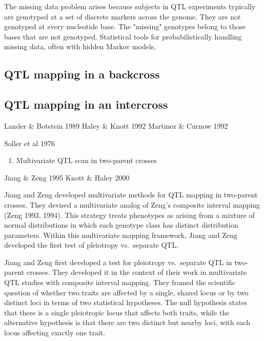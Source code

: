 \documentclass[]{article}
\providecommand{\tightlist}{%
  \setlength{\itemsep}{0pt}\setlength{\parskip}{0pt}}
\begin{document}
The missing data problem arises because subjects in QTL experiments typically are genotyped at a set of discrete markers across the genome. They are not genotyped at every nucleotide base. The "missing" genotypes belong to those bases that are not genotyped. Statistical tools for probabilistically handling missing data, often with hidden Markov models, 




\subsection{QTL mapping in a backcross}




\subsection{QTL mapping in an intercross}




Lander \& Botstein 1989 Haley \& Knott 1992 Martinez \& Curnow 1992

Soller et al 1976

\begin{enumerate}
\def\labelenumi{\arabic{enumi}.}
\setcounter{enumi}{2}
\tightlist
\item
  Multivariate QTL scan in two-parent crosses
\end{enumerate}

Jiang \& Zeng 1995 Knott \& Haley 2000

Jiang and Zeng developed multivariate methods for QTL mapping in
two-parent crosses. They devised a multivariate analog of Zeng's
composite interval mapping (Zeng 1993, 1994). This strategy treats
phenotypes as arising from a mixture of normal distributions in which
each genotype class has distinct distribution parameters. Within this
multivariate mapping framework, Jiang and Zeng developed the first test
of pleiotropy vs.~separate QTL.

Jiang and Zeng first developed a test for pleiotropy vs.~separate QTL in
two-parent crosses. They developed it in the context of their work in
multivariate QTL studies with composite interval mapping. They framed
the scientific question of whether two traits are affected by a single,
shared locus or by two distinct loci in terms of two statistical
hypotheses. The null hypothesis states that there is a single
pleiotropic locus that affects both traits, while the alternative
hypothesis is that there are two distinct but nearby loci, with each
locus affecting exactly one trait.
\end{document}
